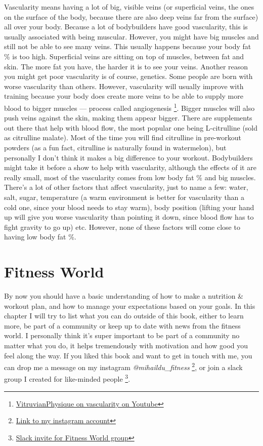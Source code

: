 \documentclass[openany, 12pt]{book}
\begin{document}
        Vascularity means having a lot of big, visible veins (or superficial veins, the ones on the surface of the body, because there are also deep veins far from the surface) all over your body.
        Because a lot of bodybuilders have good vascularity, this is usually associated with being muscular. However, you might have big muscles and still not be able to see many veins. This usually
        happens because your body fat \% is too high. Superficial veins are sitting on top of muscles, between fat and skin. The more fat you have, the harder it is to see your veins.
        Another reason you might get poor vascularity is of course, genetics. Some people are born with worse vascularity than others. However, vascularity will usually improve with training
        because your body does create more veins to be able to supply more blood to bigger muscles --- process called angiogenesis
        \footnote{\href{https://www.youtube.com/watch?v=N1oCJiw8oTY}{VitruvianPhysique on vascularity on Youtube}}. Bigger muscles will also push veins against the skin, making them appear bigger.
        There are supplements out there that help with blood flow, the most popular one being L-citrulline (sold as citrulline malate). Most of the time you will find citrulline in pre-workout
        powders (as a fun fact, citrulline is naturally found in watermelon), but personally I don't think it makes a big difference to your workout. Bodybuilders might take it before a show
        to help with vascularity, although the effects of it are really small, most of the vascularity comes from low body fat \% and big muscles.
        There's a lot of other factors that affect vascularity, just to name a few:
        water, salt, sugar, temperature (a warm environment is better for vascularity than a cold one, since your blood needs to stay warm), body position (lifting your hand up will give you worse
        vascularity than pointing it down, since blood flow has to fight gravity to go up) etc. However, none of these factors will come close to having low body fat \%.

  \chapter{Fitness World}

  By now you should have a basic understanding of how to make a nutrition \& workout plan, and how to manage your expectations based on your goals. In this chapter I will try to
  list what you can do outside of this book, either to learn more, be part of a community or keep up to date with news from the fitness world. I personally think it's super important
  to be part of a community no matter what you do, it helps tremendously with motivation and how good you feel along the way. If you liked this book and want to get in touch with me,
  you can drop me a message on my instagram \textit{@mihaildu\_fitness}
  \footnote{\href{https://www.instagram.com/mihaildu_fitness/}{Link to my instagram account}}, or join a slack group I created for like-minded people
  \footnote{\href{https://join.slack.com/t/fitness-world-group/shared_invite/zt-1bhw1fakw-X5vr_m1DwEv2tAelIcWj1w}{Slack invite for Fitness World group}}.
\end{document}
